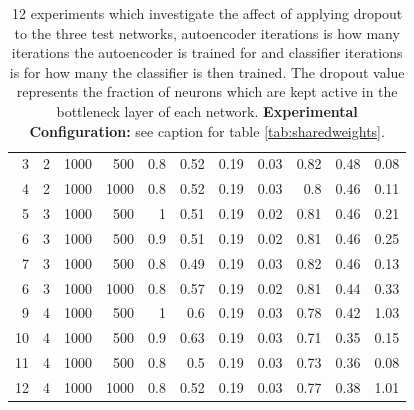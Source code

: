 \begin{table}[h]
{\begin{tabular}{rllrrrrrrrr}
          3                    & 2       & 1000             & 500       & 0.8      & 0.52     & 0.19      & 0.03      & 0.82                 & 0.48                 & 0.08                 \\
          4                    & 2       & 1000             & 1000       & 0.8      & 0.52     & 0.19      & 0.03      & 0.8                  & 0.46                 & 0.11                 \\
          \hline
          5                    & 3       & 1000             & 500       & 1        & 0.51     & 0.19      & 0.02      & 0.81                 & 0.46                 & 0.21                 \\
          6                    & 3       & 1000             & 500       & 0.9      & 0.51     & 0.19      & 0.02      & 0.81                 & 0.46                 & 0.25                 \\
          7                    & 3       & 1000             & 500       & 0.8      & 0.49     & 0.19      & 0.03      & 0.82                 & 0.46                 & 0.13                 \\
          6                    & 3       & 1000             & 1000       & 0.8      & 0.57     & 0.19      & 0.02      & 0.81                 & 0.44                 & 0.33                 \\
          \hline
          9                    & 4       & 1000             & 500       & 1        & 0.6      & 0.19      & 0.03      & 0.78                 & 0.42                 & 1.03                 \\
          10                   & 4       & 1000             & 500       & 0.9      & 0.63     & 0.19      & 0.03      & 0.71                 & 0.35                 & 0.15                 \\
          11                   & 4       & 1000             & 500       & 0.8      & 0.5      & 0.19      & 0.03      & 0.73                 & 0.36                 & 0.08\\
          12                   & 4       & 1000             & 1000       & 0.8      & 0.52      & 0.19      & 0.03      & 0.77   & 0.38     & 1.01\\
          \hline
          \end{tabular}
          }
          \caption{12 experiments which investigate the affect of applying dropout to the
          three test networks, autoencoder iterations is how many iterations
          the autoencoder is trained for and classifier iterations is for how many the
          classifier is then trained. The dropout value represents the
          fraction of neurons which are kept active in the bottleneck layer of each network.
          {\bf Experimental Configuration:} see caption for table \ref{tab:sharedweights}.}
          \label{tab:dropout}
          \end{table}

